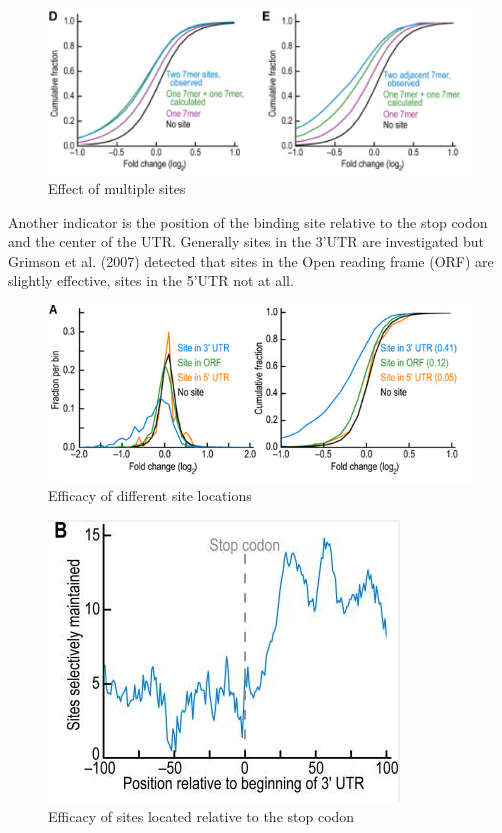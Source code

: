 \documentclass[12pt]{article}
\begin{document}
\begin{figure}[h]
\centering
\includegraphics[scale=0.7]{results/sites_distance.PNG}
\caption{Effect of multiple sites}
\label{sitedistance}
\end{figure}

Another indicator is the position of the binding site relative to the stop codon and the center of the UTR. Generally sites in the 3'UTR are investigated but Grimson et al. (2007) detected that sites in the Open reading frame (ORF) are slightly effective, sites in the 5'UTR not at all. \\

\begin{figure}[h]
\centering
\includegraphics[scale=0.6]{results/sites_orf.PNG}
\caption{Efficacy of different site locations}
\label{siteorf}
\end{figure}

\begin{figure}[h]
\centering
\includegraphics[scale=0.5]{results/site_stop.PNG} 
\caption{Efficacy of sites located relative to the stop codon}
\label{sitestop}
\end{figure}
\end{document}
